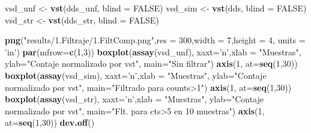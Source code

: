 \documentclass[
]{article}
\newenvironment{Shaded}{\begin{snugshade}}{\end{snugshade}}
\newcommand{\DataTypeTok}[1]{\textcolor[rgb]{0.13,0.29,0.53}{#1}}
\newcommand{\DecValTok}[1]{\textcolor[rgb]{0.00,0.00,0.81}{#1}}
\newcommand{\KeywordTok}[1]{\textcolor[rgb]{0.13,0.29,0.53}{\textbf{#1}}}
\newcommand{\NormalTok}[1]{#1}
\newcommand{\OtherTok}[1]{\textcolor[rgb]{0.56,0.35,0.01}{#1}}
\newcommand{\StringTok}[1]{\textcolor[rgb]{0.31,0.60,0.02}{#1}}
\begin{document}
\begin{Shaded}
\begin{Highlighting}[]
\NormalTok{vsd_unf <-}\StringTok{ }\KeywordTok{vst}\NormalTok{(dds_unf, }\DataTypeTok{blind =} \OtherTok{FALSE}\NormalTok{)}
\NormalTok{vsd_sim <-}\StringTok{ }\KeywordTok{vst}\NormalTok{(dds, }\DataTypeTok{blind =} \OtherTok{FALSE}\NormalTok{)}
\NormalTok{vsd_str <-}\StringTok{ }\KeywordTok{vst}\NormalTok{(dds_str, }\DataTypeTok{blind =} \OtherTok{FALSE}\NormalTok{)}
\end{Highlighting}
\end{Shaded}

\begin{Shaded}
\begin{Highlighting}[]
\KeywordTok{png}\NormalTok{(}\StringTok{"results/1.Filtraje/1.FiltComp.png"}\NormalTok{,}\DataTypeTok{res =} \DecValTok{300}\NormalTok{,}\DataTypeTok{width =} \DecValTok{7}\NormalTok{,}\DataTypeTok{height =} \DecValTok{4}\NormalTok{, }\DataTypeTok{units =} \StringTok{'in'}\NormalTok{)}
\KeywordTok{par}\NormalTok{(}\DataTypeTok{mfrow=}\KeywordTok{c}\NormalTok{(}\DecValTok{1}\NormalTok{,}\DecValTok{3}\NormalTok{))}
\KeywordTok{boxplot}\NormalTok{(}\KeywordTok{assay}\NormalTok{(vsd_unf), }\DataTypeTok{xaxt=}\StringTok{'n'}\NormalTok{,}\DataTypeTok{xlab =} \StringTok{"Muestras"}\NormalTok{, }
        \DataTypeTok{ylab=}\StringTok{"Contaje normalizado por vst"}\NormalTok{, }\DataTypeTok{main=}\StringTok{"Sin filtrar"}\NormalTok{)}
\KeywordTok{axis}\NormalTok{(}\DecValTok{1}\NormalTok{, }\DataTypeTok{at=}\KeywordTok{seq}\NormalTok{(}\DecValTok{1}\NormalTok{,}\DecValTok{30}\NormalTok{))}
\KeywordTok{boxplot}\NormalTok{(}\KeywordTok{assay}\NormalTok{(vsd_sim), }\DataTypeTok{xaxt=}\StringTok{'n'}\NormalTok{,}\DataTypeTok{xlab =} \StringTok{"Muestras"}\NormalTok{, }
        \DataTypeTok{ylab=}\StringTok{"Contaje normalizado por vst"}\NormalTok{, }\DataTypeTok{main=}\StringTok{"Filtrado para counts>1"}\NormalTok{)}
\KeywordTok{axis}\NormalTok{(}\DecValTok{1}\NormalTok{, }\DataTypeTok{at=}\KeywordTok{seq}\NormalTok{(}\DecValTok{1}\NormalTok{,}\DecValTok{30}\NormalTok{))}
\KeywordTok{boxplot}\NormalTok{(}\KeywordTok{assay}\NormalTok{(vsd_str), }\DataTypeTok{xaxt=}\StringTok{'n'}\NormalTok{,}\DataTypeTok{xlab =} \StringTok{"Muestras"}\NormalTok{, }
        \DataTypeTok{ylab=}\StringTok{"Contaje normalizado por vst"}\NormalTok{, }\DataTypeTok{main=}\StringTok{"Flt. para cts>5 en 10 muestras"}\NormalTok{)}
\KeywordTok{axis}\NormalTok{(}\DecValTok{1}\NormalTok{, }\DataTypeTok{at=}\KeywordTok{seq}\NormalTok{(}\DecValTok{1}\NormalTok{,}\DecValTok{30}\NormalTok{))}
\KeywordTok{dev.off}\NormalTok{()}
\end{Highlighting}
\end{Shaded}
\end{document}

